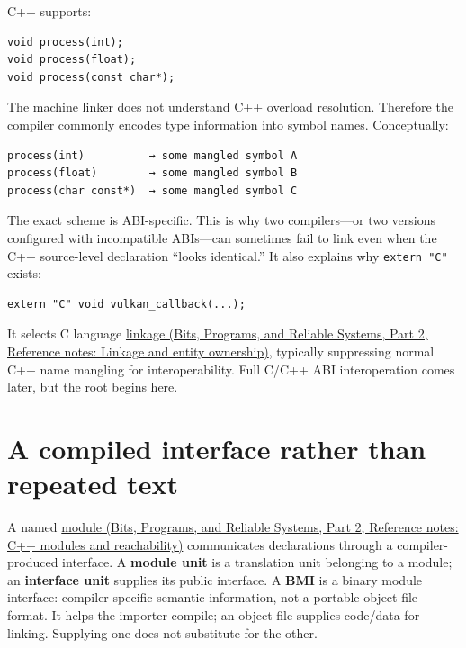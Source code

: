 C++ supports:

\begin{verbatim}
void process(int);
void process(float);
void process(const char*);
\end{verbatim}

The machine linker does not understand C++ overload resolution. Therefore the compiler commonly encodes type information into symbol names. Conceptually:

\begin{verbatim}
process(int)          → some mangled symbol A
process(float)        → some mangled symbol B
process(char const*)  → some mangled symbol C
\end{verbatim}

The exact scheme is ABI-specific. This is why two compilers---or two versions configured with incompatible ABIs---can sometimes fail to link even when the C++ source-level declaration ``looks identical.'' It also explains why \texttt{extern\ "C"} exists:

\begin{verbatim}
extern "C" void vulkan_callback(...);
\end{verbatim}

It selects C language \href{../01-Bits-Programs-and-Reliable-Systems-P02/main.pdf\#nameddest=appendix-74a0ec818c18}{linkage (Bits, Programs, and Reliable Systems, Part 2, Reference notes: Linkage and entity ownership)}, typically suppressing normal C++ name mangling for interoperability. Full C/C++ ABI interoperation comes later, but the root begins here.

\section{A compiled interface rather than repeated text}\label{05-engine-i-ch002-a-compiled-interface-rather-than-repeated-text}

\hypertarget{05-engine-i-ch002-a-compiled-interface-rather-than-repeated-text}{}

A named \href{../01-Bits-Programs-and-Reliable-Systems-P02/main.pdf\#nameddest=appendix-410a611a5b8d}{module (Bits, Programs, and Reliable Systems, Part 2, Reference notes: C++ modules and reachability)} communicates declarations through a compiler-produced interface. A \textbf{module unit} is a translation unit belonging to a module; an \textbf{interface unit} supplies its public interface. A \textbf{BMI} is a binary module interface: compiler-specific semantic information, not a portable object-file format. It helps the importer compile; an object file supplies code/data for linking. Supplying one does not substitute for the other.

